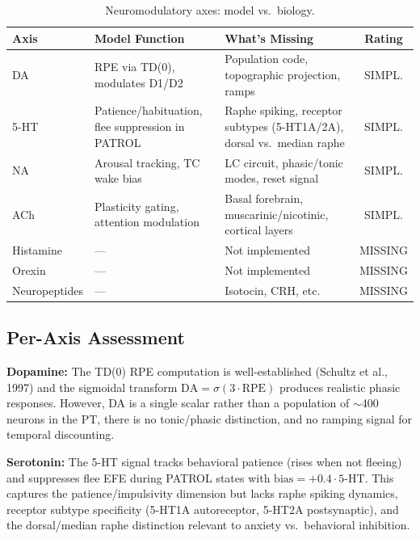 \documentclass[11pt,a4paper]{article}
\begin{document}
\begin{table}[H]
\centering
\caption{Neuromodulatory axes: model vs.\ biology.}\label{tab:neuromod}
\begin{tabular}{@{}lp{4.5cm}p{4.5cm}c@{}}
\toprule
\textbf{Axis} & \textbf{Model Function} & \textbf{What's Missing} & \textbf{Rating} \\
\midrule
DA & RPE via TD(0), modulates D1/D2 & Population code, topographic projection, ramps & \textcolor{simplified}{SIMPL.} \\
5-HT & Patience/habituation, flee suppression in PATROL & Raphe spiking, receptor subtypes (5-HT1A/2A), dorsal vs.\ median raphe & \textcolor{simplified}{SIMPL.} \\
NA & Arousal tracking, TC wake bias & LC circuit, phasic/tonic modes, reset signal & \textcolor{simplified}{SIMPL.} \\
ACh & Plasticity gating, attention modulation & Basal forebrain, muscarinic/nicotinic, cortical layers & \textcolor{simplified}{SIMPL.} \\
\midrule
Histamine & --- & Not implemented & \textcolor{missing}{MISSING} \\
Orexin & --- & Not implemented & \textcolor{missing}{MISSING} \\
Neuropeptides & --- & Isotocin, CRH, etc. & \textcolor{missing}{MISSING} \\
\bottomrule
\end{tabular}
\end{table}

\subsection{Per-Axis Assessment}

\textbf{Dopamine:} The TD(0) RPE computation is well-established
(Schultz et al., 1997) and the sigmoidal transform $\text{DA} = \sigma(3 \cdot \text{RPE})$
produces realistic phasic responses.  However, DA is a single scalar rather than
a population of $\sim$400 neurons in the PT, there is no tonic/phasic distinction,
and no ramping signal for temporal discounting.

\textbf{Serotonin:} The 5-HT signal tracks behavioral patience (rises when not fleeing)
and suppresses flee EFE during PATROL states with
$\text{bias} = +0.4 \cdot \text{5-HT}$.  This captures the patience/impulsivity
dimension but lacks raphe spiking dynamics, receptor subtype specificity
(5-HT1A autoreceptor, 5-HT2A postsynaptic), and the dorsal/median raphe distinction
relevant to anxiety vs.\ behavioral inhibition.
\end{document}
